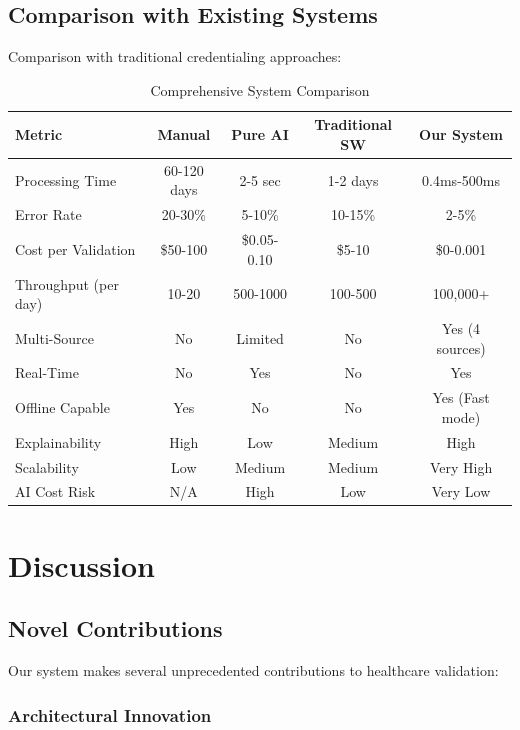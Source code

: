\documentclass[conference]{IEEEtran}
\begin{document}
\subsection{Comparison with Existing Systems}

Comparison with traditional credentialing approaches:

\begin{table}[htbp]
\caption{Comprehensive System Comparison}
\begin{center}
\small
\begin{tabular}{|l|c|c|c|c|}
\hline
\textbf{Metric} & \textbf{Manual} & \textbf{Pure AI} & \textbf{Traditional SW} & \textbf{Our System} \\
\hline
Processing Time & 60-120 days & 2-5 sec & 1-2 days & 0.4ms-500ms \\
Error Rate & 20-30\% & 5-10\% & 10-15\% & 2-5\% \\
Cost per Validation & \$50-100 & \$0.05-0.10 & \$5-10 & \$0-0.001 \\
Throughput (per day) & 10-20 & 500-1000 & 100-500 & 100,000+ \\
Multi-Source & No & Limited & No & Yes (4 sources) \\
Real-Time & No & Yes & No & Yes \\
Offline Capable & Yes & No & No & Yes (Fast mode) \\
Explainability & High & Low & Medium & High \\
Scalability & Low & Medium & Medium & Very High \\
AI Cost Risk & N/A & High & Low & Very Low \\
\hline
\end{tabular}
\label{tab:comparison}
\end{center}
\end{table}

\section{Discussion}

\subsection{Novel Contributions}

Our system makes several unprecedented contributions to healthcare validation:

\subsubsection{Architectural Innovation}
\end{document}

